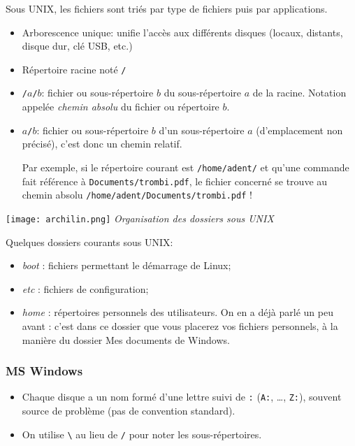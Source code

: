 Sous UNIX, les fichiers sont triés par type de fichiers puis par applications. 

\begin{itemize}
\item Arborescence unique: unifie l'accès aux différents disques
  (locaux, distants, disque dur, clé USB, etc.)
\item Répertoire racine noté \texttt{/}
\item \texttt{/$a$/$b$}: fichier ou sous-répertoire  $b$ du
  sous-répertoire $a$ de la racine. Notation appelée \emph{chemin
    absolu} du fichier ou répertoire $b$.
\item \texttt{$a$/$b$}: fichier ou sous-répertoire $b$ d'un sous-répertoire $a$ (d'emplacement non précisé), c'est donc un chemin relatif. 
	  
	  Par exemple, si le répertoire courant est \texttt{/home/adent/} et qu'une commande fait référence à \texttt{Documents/trombi.pdf}, le fichier concerné se trouve au chemin absolu \texttt{/home/adent/Documents/trombi.pdf} !
\end{itemize}

\begin{minipage}[c]{.49\linewidth}
\begin{center}
\texttt{[image: archilin.png]}
\textit{Organisation des dossiers sous UNIX}
\end{center}
\end{minipage} \hfill
\begin{minipage}[c]{.49\linewidth}

Quelques dossiers courants sous UNIX:
\begin{itemize}
\item \textit{boot} : fichiers permettant le démarrage de Linux;
\item \textit{etc} : fichiers de configuration;
\item \textit{home} : répertoires personnels des utilisateurs. On en a déjà parlé un peu avant : c'est dans ce dossier que vous placerez vos fichiers personnels, à la manière du dossier Mes documents de Windows.
\end{itemize}
\end{minipage}

\subsubsection{MS Windows}

\begin{itemize}
\item Chaque disque a un nom formé d'une lettre suivi de
  \og{}\texttt{:}\fg{} (\texttt{A:}, \ldots{}, \texttt{Z:}), souvent
  source de problème (pas de convention standard).
\item On utilise \texttt{\textbackslash{}} au lieu de \texttt{/} pour
  noter les sous-répertoires.
\end{itemize}

